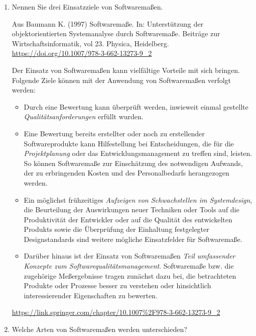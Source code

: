 \documentclass{bschlangaul-aufgabe}
\begin{document}
\begin{enumerate}

\item Nennen Sie drei Einsatzziele von Softwaremaßen.

\begin{liAntwort}
Aus
Baumann K. (1997) Softwaremaße. In: Unterstützung der objektorientierten
Systemanalyse durch Softwaremaße. Beiträge zur Wirtschaftsinformatik,
vol 23. Physica, Heidelberg. \url{https://doi.org/10.1007/978-3-662-13273-9_2}

Der Einsatz von Softwaremaßen kann vielfältige Vorteile mit sich
bringen. Folgende Ziele können mit der Anwendung von Softwaremaßen
verfolgt werden:

\begin{itemize}
\item Durch eine Bewertung kann überprüft werden, inwieweit einmal
gestellte \emph{Qualitätsanforderungen} erfüllt wurden.

\item Eine Bewertung bereits erstellter oder noch zu erstellender
Softwareprodukte kann Hilfestellung bei Entscheidungen, die für die
\emph{Projektplanung} oder das Entwicklungsmanagement zu treffen sind,
leisten. So können Softwaremaße zur Einschätzung des notwendigen
Aufwands, der zu erbringenden Kosten und des Personalbedarfs
herangezogen werden.

\item Ein möglichst frühzeitiges \emph{Aufzeigen von Schwachstellen im
Systemdesign}, die Beurteilung der Auswirkungen neuer Techniken oder
Tools auf die Produktivität der Entwickler oder auf die Qualität des
entwickelten Produkts sowie die Überprüfung der Einhaltung festgelegter
Designstandards sind weitere mögliche Einsatzfelder für Softwaremaße.

\item Darüber hinaus ist der Einsatz von Softwaremaßen \emph{Teil
umfassender Konzepte zum Softwarequalitätsmanagement}. Softwaremaße bzw.
die zugehörige Meßergebnisse tragen zunächst dazu bei, die betrachteten
Produkte oder Prozesse besser zu verstehen oder hinsichtlich
interessierender Eigenschaften zu bewerten.
\end{itemize}

\url{https://link.springer.com/chapter/10.1007%2F978-3-662-13273-9_2}
\end{liAntwort}


\item Welche Arten von Softwaremaßen werden unterschieden?


\end{enumerate}
\end{document}
